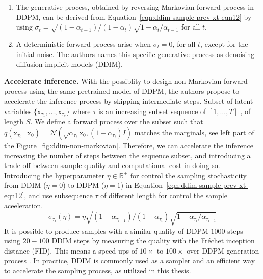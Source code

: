 \begin{enumerate}
    \item The generative process, obtained by reversing Markovian forward process in DDPM, can be derived from Equation~\ref{eqn:ddim-sample-prev-xt-eqn12} by using $\sigma_{t} = \sqrt{(1-\alpha_{t-1}) / (1 - \alpha_{t})}\sqrt{1-\alpha_{t}/\alpha_{t-1}}$ for all $t$.
    \item A deterministic forward process arise when $\sigma_{t}=0$, for all $t$, except for the initial noise. The authors names this specific generative process as denoising diffusion implicit models (DDIM).
\end{enumerate}

\noindent \textbf{Accelerate inference.} With the possiblity to design non-Markovian forward process using the same pretrained model of DDPM, the authors propose to accelerate the inference process by skipping intermediate steps. Subset of latent variables $\{\mathrm{x}_{\tau_1}, \dots, \mathrm{x}_{\tau_{s}} \}$ where $\tau$ is an increasing subset sequence of $[1, \dots, T]$ , of length $S$. We define a forward process over the subset such that $q(\mathrm{x}_{\tau_i}\mid\mathrm{x}_{0})=\mathcal{N}(\sqrt{\alpha_{\tau_{i}}}\mathrm{x}_{0}, (1-\alpha_{\tau_{i}})I)$ matches the marginals, see left part of the Figure~\ref{fig:ddim-non-markovian}. Therefore, we can accelerate the inference increasing the number of steps between the sequence subset, and introducing a trade-off between sample quality and computational cost in doing so. \\

\noindent Introducing the hyperparameter $\eta\in\mathbb{R}^{+}$ for control the
sampling stochasticity from DDIM ($\eta=0$) to DDPM ($\eta=1$) in Equation~\ref{eqn:ddim-sample-prev-xt-eqn12}, and use subsequence $\tau$ of different length 
for control the sample aceeleration.
\begin{equation}\label{eqn:ddim-to-ddpm-variance}
    \sigma_{\tau_{i}}(\eta) = \eta \sqrt{(1-\alpha_{\tau_{i-1}}) / (1-\alpha_{\tau_{i}})}\sqrt{1-\alpha_{\tau_{i}}/\alpha_{\tau_{i-1}}}
\end{equation}
It is possible to produce samples with a similar quality of DDPM $1000$ steps using $20-100$ DDIM steps by measuring the quality with the Fréchet inception distance (FID). This means a speed ups of $10\times$ to $100\times$ over DDPM generation process \cite{song2020denoising}. In practice, DDIM is commonly used as a sampler and an efficient way to accelerate the sampling process, as utilized in this thesis. \\

